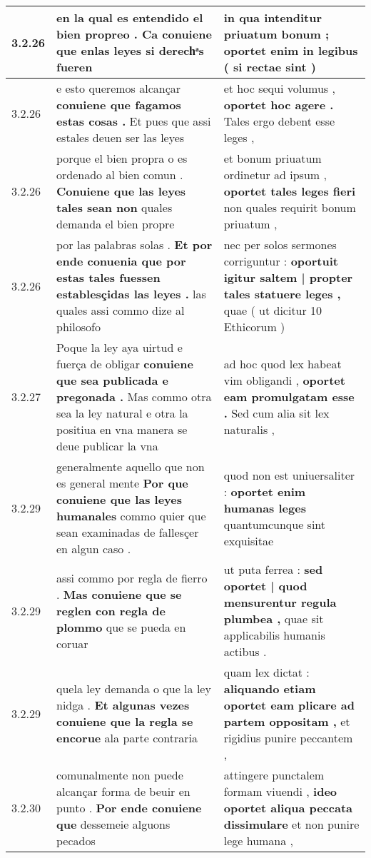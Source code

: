 \begin{tabular}{|p{1cm}|p{6.5cm}|p{6.5cm}|}
3.2.26 & en la qual es entendido el bien propreo . \textbf{ Ca conuiene que enlas leyes } si derechͣs fueren & in qua intenditur priuatum bonum ; \textbf{ oportet enim in legibus } ( si rectae sint ) \\\hline
3.2.26 & e esto queremos alcançar \textbf{ conuiene que fagamos estas cosas . } Et pues que assi estales deuen ser las leyes & et hoc sequi volumus , \textbf{ oportet hoc agere . } Tales ergo debent esse leges , \\\hline
3.2.26 & porque el bien propra o es ordenado al bien comun . \textbf{ Conuiene que las leyes tales sean non } quales demanda el bien propre & et bonum priuatum ordinetur ad ipsum , \textbf{ oportet tales leges fieri } non quales requirit bonum priuatum , \\\hline
3.2.26 & por las palabras solas . \textbf{ Et por ende conuenia que por estas tales fuessen establesçidas las leyes . } las quales assi commo dize al philosofo & nec per solos sermones corriguntur : \textbf{ oportuit igitur saltem | propter tales statuere leges , } quae ( ut dicitur 10 Ethicorum ) \\\hline
3.2.27 & Poque la ley aya uirtud e fuerça de obligar \textbf{ conuiene que sea publicada e pregonada . } Mas commo otra sea la ley natural e otra la positiua en vna manera se deue publicar la vna & ad hoc quod lex habeat vim obligandi , \textbf{ oportet eam promulgatam esse . } Sed cum alia sit lex naturalis , \\\hline
3.2.29 & generalmente aquello que non es general mente \textbf{ Por que conuiene que las leyes humanales } commo quier que sean examinadas de fallesçer en algun caso . & quod non est uniuersaliter : \textbf{ oportet enim humanas leges } quantumcunque sint exquisitae \\\hline
3.2.29 & assi commo por regla de fierro . \textbf{ Mas conuiene que se reglen con regla de plommo } que se pueda en coruar & ut puta ferrea : \textbf{ sed oportet | quod mensurentur regula plumbea , } quae sit applicabilis humanis actibus . \\\hline
3.2.29 & quela ley demanda o que la ley nidga . \textbf{ Et algunas vezes conuiene que la regla se encorue } ala parte contraria & quam lex dictat : \textbf{ aliquando etiam oportet eam plicare ad partem oppositam , } et rigidius punire peccantem , \\\hline
3.2.30 & comunalmente non puede alcançar forma de beuir en punto . \textbf{ Por ende conuiene que } dessemeie alguons pecados & attingere punctalem formam viuendi , \textbf{ ideo oportet aliqua peccata dissimulare } et non punire lege humana , \\\hline

\end{tabular}
